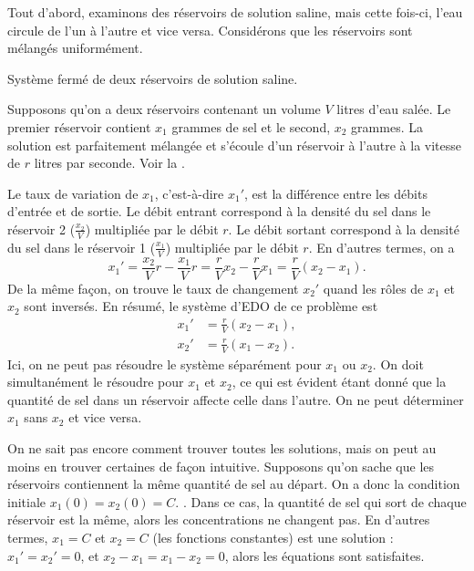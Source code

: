 \begin{example} \label{sintro:closedbrine-example}
Tout d'abord, examinons des réservoirs de solution saline, mais cette fois-ci, l'eau circule de l'un à l'autre et vice versa. Considérons que les réservoirs sont mélangés uniformément.

\begin{myfig}
\capstart
{}
\caption{Système fermé de deux réservoirs de solution saline.\label{sintro:closedbrine}}
\end{myfig}

Supposons qu'on a deux réservoirs contenant un volume $V$ litres d’eau salée. Le premier réservoir contient $x_1$ grammes de sel et le second, $x_2$ grammes. La solution est parfaitement mélangée et s'écoule d’un réservoir à l’autre à la vitesse de $r$ litres par seconde. Voir la .

Le taux de variation de $x_1$,
c’est-à-dire $x_1'$, est la différence entre les débits d’entrée et de sortie. Le débit entrant correspond à la densité du sel dans le réservoir 2 ($\frac{x_2}{V}$) multipliée par le débit $r$.
Le débit sortant correspond à la densité du sel dans le réservoir 1 ($\frac{x_1}{V}$) multipliée par le débit $r$.
En d'autres termes, on a
\begin{equation*}
x_1' = \frac{x_2}{V} r - \frac{x_1}{V} r =
\frac{r}{V} x_2 - \frac{r}{V} x_1  = \frac{r}{V} (x_2-x_1).
\end{equation*}
De la même façon, on trouve le taux de changement $x_2'$ quand les rôles de $x_1$ et $x_2$
sont inversés. En résumé, le système d'EDO de ce problème est
\begin{align*}
x_1' & = \frac{r}{V} (x_2-x_1), \\
x_2' & = \frac{r}{V} (x_1-x_2).
\end{align*}
Ici, on ne peut pas résoudre le système séparément pour $x_1$ ou $x_2$.  On doit simultanément le résoudre pour $x_1$ et $x_2$, ce qui est évident étant donné que la quantité de sel dans un réservoir affecte celle dans l’autre. On ne peut déterminer $x_1$ sans  $x_2$ et vice versa.

On ne sait pas encore comment trouver toutes les solutions, mais on peut au moins en trouver certaines de façon intuitive. Supposons qu'on sache que les réservoirs contiennent la même quantité de sel au départ. On a donc la condition initiale $x_1(0)=x_2(0) = C$.  . Dans ce cas, la quantité de sel qui sort de chaque réservoir est la même, alors les concentrations ne changent pas. En d’autres termes, $x_1 = C$ et $x_2 = C$ (les fonctions constantes) est une solution :  $x_1' = x_2' = 0$, et
$x_2-x_1 = x_1-x_2 = 0$, alors les équations sont satisfaites.


\end{example}
